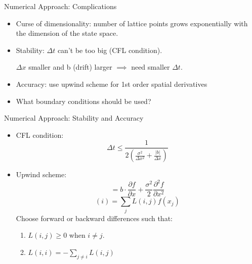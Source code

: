 \documentclass{beamer}
\begin{document}
\begin{frame}{Numerical Approach: Complications}
		\begin{itemize}
			\item {
				Curse of dimensionality: number of lattice points grows exponentially with the dimension of the state space.
				
			}
			\item {
				Stability: $\Delta t$ can't be too big (CFL condition).
				\begin{center}
					$\Delta x$ smaller and b (drift) larger $\implies$ need smaller $\Delta t$.
				\end{center}
			}
			\item {
				Accuracy: use upwind scheme for 1st order spatial derivatives
			}
			\item {
				What boundary conditions should be used?
			}
		\end{itemize}
\end{frame}

	\begin{frame}{Numerical Approach: Stability and Accuracy}
		\begin{itemize}
			\item CFL condition:
			\begin{equation} 
			\Delta t \leq \frac{1}{2(\frac{\sigma^2}{\Delta x^2}+\frac{|b|}{\Delta x})}
			\end{equation}
			\item Upwind scheme:
			\begin{equation}
			[Lf]=b \cdot \frac{\partial f}{\partial x} + \frac{\sigma^2}{2}\frac{\partial^2 f}{\partial x^2}
			\end{equation}
			\begin{equation}
			[Lf](i)=\sum_{j} L(i,j) f(x_j)
			\end{equation}
			Choose forward or backward differences such that:
			\begin{enumerate}
				\item $L(i,j)\geq 0$ when $i \neq j$.
				\item $L(i,i)=-\sum_{j\neq i} L(i,j)$
			\end{enumerate}
			
		\end{itemize}
	\end{frame}
	
\end{document}
